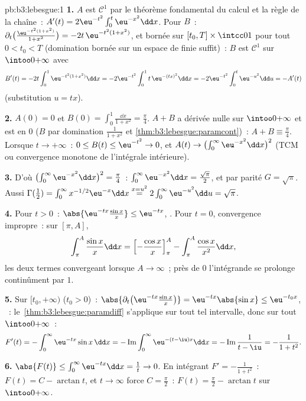 \begin{solution}{pb:b3:lebesgue:1}
\textbf{1.} $A$ est $\mathcal C^1$ par le théorème
fondamental du calcul et la règle de la chaîne~: $A'(t) =
2\eu^{-t^2}\int_0^t\eu^{-x^2}\dd x$. Pour $B$~:
$\partial_t\bigl(\frac{\eu^{-t^2(1+x^2)}}{1+x^2}\bigr) =
-2t\,\eu^{-t^2(1+x^2)}$,  et bornée sur $[t_0, T]
\times \intcc01$ pour tout $0 < t_0 < T$ (domination bornée
sur un espace de  finie suffit)~: $B$ est $\mathcal
C^1$ sur $\intoo0{+\infty}$ avec
\[
B'(t) = -2t\int_0^1 \eu^{-t^2(1+x^2)}\dd x
= -2\eu^{-t^2}\int_0^1 t\,\eu^{-(tx)^2}\dd x
= -2\eu^{-t^2}\int_0^t\eu^{-u^2}\dd u = -A'(t)
\]
(substitution $u = tx$).

\textbf{2.} $A(0) = 0$ et $B(0) = \int_0^1\frac{\dd x}{1+x^2}
= \frac\pi4$. $A + B$ a dérivée nulle sur
$\intoo0{+\infty}$ et est  en $0$ ($B$ par
domination $\frac1{1+x^2}$ et
\cref{thm:b3:lebesgue:paramcont})~: $A + B \equiv
\frac\pi4$. Lorsque $t\to+\infty$~: $0 \leq B(t) \leq
\eu^{-t^2} \to 0$, et $A(t) \to
\bigl(\int_0^\infty\eu^{-x^2}\dd x\bigr)^2$ (TCM ou 
convergence monotone de l'intégrale intérieure).

\textbf{3.} D'où $\bigl(\int_0^\infty\eu^{-x^2}\dd
x\bigr)^2 = \frac\pi4$~: $\int_0^\infty\eu^{-x^2}\dd x =
\frac{\sqrt\pi}2$, et par parité $G = \sqrt\pi$. Aussi
$\Gamma(\frac12) = \int_0^\infty x^{-1/2}\eu^{-x}\dd x
\overset{x = u^2}{=} 2\int_0^\infty\eu^{-u^2}\dd u =
\sqrt\pi$.

\textbf{4.} Pour $t > 0$~: $\abs{\eu^{-tx}\frac{\sin x}x}
\leq \eu^{-tx}$, . Pour $t = 0$, convergence
impropre~: sur $[\pi, A]$,
\[
\int_\pi^A\frac{\sin x}x\dd x
= \Bigl[-\frac{\cos x}x\Bigr]_\pi^A -
\int_\pi^A\frac{\cos x}{x^2}\dd x,
\]
les deux termes convergeant lorsque $A \to \infty$~; près
de $0$ l'intégrande se prolonge continûment par $1$.

\textbf{5.} Sur $[t_0, +\infty)$ ($t_0 > 0$)~:
$\abs{\partial_t\bigl(\eu^{-tx}\tfrac{\sin x}x\bigr)} =
\eu^{-tx}\abs{\sin x} \leq \eu^{-t_0x}$, ~:
le~\cref{thm:b3:lebesgue:paramdiff} s'applique sur tout tel
intervalle, donc sur tout $\intoo0{+\infty}$~:
\[
F'(t) = -\int_0^\infty\eu^{-tx}\sin x\,\dd x
= -\operatorname{Im}\int_0^\infty\eu^{-(t - \iu)x}\dd x
= -\operatorname{Im}\frac{1}{t - \iu} = -\frac{1}{1 + t^2}.
\]

\textbf{6.} $\abs{F(t)} \leq \int_0^\infty\eu^{-tx}\dd x =
\frac1t \to 0$. En intégrant $F' = -\frac1{1+t^2}$~: $F(t)
= C - \arctan t$, et $t \to \infty$ force $C = \frac\pi2$~:
$F(t) = \frac\pi2 - \arctan t$ sur $\intoo0{+\infty}$.


\end{solution}
